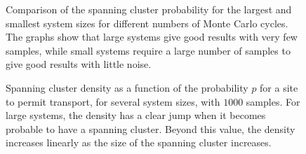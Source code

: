 \documentclass[11pt,british,a4paper]{report}
\begin{document}
\begin{figure}[tbh]
    \centering
    \caption{Comparison of the spanning cluster probability for the largest and smallest system sizes for different numbers of Monte Carlo cycles. The graphs show that large systems give good results with very few samples, while small systems require a large number of samples to give good results with little noise.}%
    \label{fig:PIs}
\end{figure}
\begin{figure}[tbh]
    \centering
    \caption{Spanning cluster density as a function of the probability \(p\) for a site to permit transport, for several system sizes, with \(\num{1000}\) samples. For large systems, the density has a clear jump when it becomes probable to have a spanning cluster. Beyond this value, the density increases linearly as the size of the spanning cluster increases.}%
    \label{fig:PL}
\end{figure}
\end{document}
